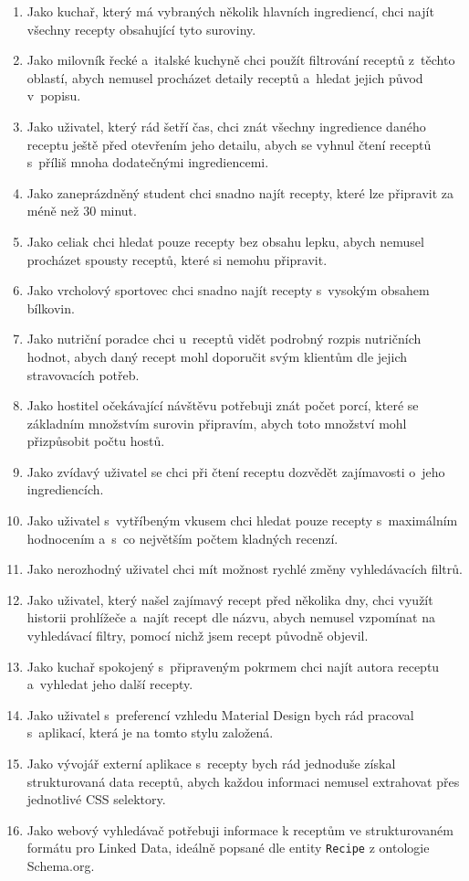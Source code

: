 \begin{enumerate}
    \item Jako kuchař, který má vybraných několik hlavních ingrediencí, chci najít všechny recepty obsahující tyto suroviny.
    \item Jako milovník řecké a~italské kuchyně chci použít filtrování receptů z~těchto oblastí, abych nemusel procházet detaily receptů a~hledat jejich původ v~popisu.
    \item Jako uživatel, který rád šetří čas, chci znát všechny ingredience daného receptu ještě před otevřením jeho detailu, abych se vyhnul čtení receptů s~příliš mnoha dodatečnými ingrediencemi.
    \item Jako zaneprázdněný student chci snadno najít recepty, které lze připravit za méně než $30$ minut.
    \item Jako celiak chci hledat pouze recepty bez obsahu lepku, abych nemusel procházet spousty receptů, které si nemohu připravit.
    \item Jako vrcholový sportovec chci snadno najít recepty s~vysokým obsahem bílkovin.
    \item Jako nutriční poradce chci u~receptů vidět podrobný rozpis nutričních hodnot, abych daný recept mohl doporučit svým klientům dle jejich stravovacích potřeb.
    \item Jako hostitel očekávající návštěvu potřebuji znát počet porcí, které se základním množstvím surovin připravím, abych toto množství mohl přizpůsobit počtu hostů.
    \item Jako zvídavý uživatel se chci při čtení receptu dozvědět zajímavosti o~jeho ingrediencích.
    \item Jako uživatel s~vytříbeným vkusem chci hledat pouze recepty s~maximálním hodnocením a~s~co největším počtem kladných recenzí.
    \item Jako nerozhodný uživatel chci mít možnost rychlé změny vyhledávacích filtrů.
    \item Jako uživatel, který našel zajímavý recept před několika dny, chci využít historii prohlížeče a~najít recept dle názvu, abych nemusel vzpomínat na vyhledávací filtry, pomocí nichž jsem recept původně objevil.
    \item Jako kuchař spokojený s~připraveným pokrmem chci najít autora receptu a~vyhledat jeho další recepty.
    \item Jako uživatel s~preferencí vzhledu Material Design bych rád pracoval s~aplikací, která je na tomto stylu založená.
    \item Jako vývojář externí aplikace s~recepty bych rád jednoduše získal strukturovaná data receptů, abych každou informaci nemusel extrahovat přes jednotlivé CSS selektory.
    \item Jako webový vyhledávač potřebuji informace k receptům ve strukturovaném formátu pro Linked Data, ideálně popsané dle entity \texttt{Recipe} z ontologie Schema.org.
\end{enumerate}

